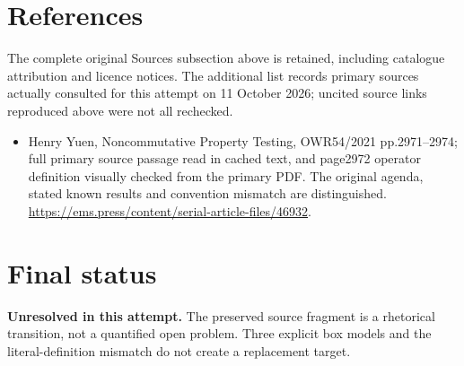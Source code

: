 \documentclass[11pt]{article}
\begin{document}
\section{References}
The complete original Sources subsection above is retained, including catalogue attribution and licence notices. The additional list records primary sources actually consulted for this attempt on 11 October 2026; uncited source links reproduced above were not all rechecked.
\begin{itemize}
\item Henry Yuen, Noncommutative Property Testing, OWR54/2021 pp.2971–2974; full primary source passage read in cached text, and page2972 operator definition visually checked from the primary PDF. The original agenda, stated known results and convention mismatch are distinguished. \url{https://ems.press/content/serial-article-files/46932}.
\end{itemize}
\section{Final status}
\textbf{Unresolved in this attempt.} The preserved source fragment is a rhetorical transition, not a quantified open problem. Three explicit box models and the literal-definition mismatch do not create a replacement target.
\end{document}
